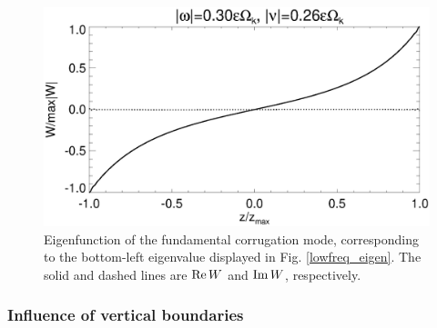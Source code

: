 \begin{figure}
  \includegraphics[width=\linewidth]{figures/eigenvector_iso}
  \caption{Eigenfunction of the fundamental corrugation mode,
    corresponding to the 
    bottom-left eigenvalue displayed in Fig. \ref{lowfreq_eigen}. The
    solid and dashed lines are $\operatorname{Re} W$ and $\operatorname{Im} W$, respectively. 
    \label{lowfreq_eigenfunc}
  }
\end{figure}

\subsubsection{Influence of vertical boundaries}
